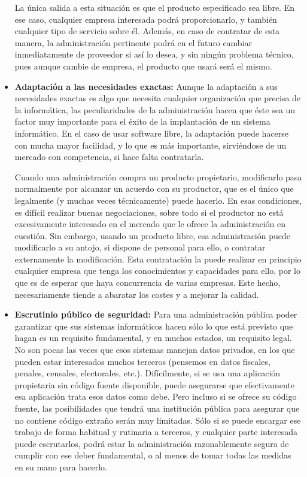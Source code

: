 \begin{itemize}
La única salida a esta situación es que el producto especificado sea libre. En ese caso, cualquier empresa interesada podrá proporcionarlo, y también cualquier tipo de servicio sobre él. Además, en caso de contratar de esta manera, la administración pertinente podrá en el futuro cambiar inmediatamente de proveedor si así lo desea, y sin ningún problema técnico, pues aunque cambie de empresa, el producto que usará será el mismo.

\item \textbf{Adaptación a las necesidades exactas:} Aunque la adaptación a sus necesidades exactas es algo que necesita cualquier organización que precisa de la informática, las peculiaridades de la administración hacen que éste sea un factor muy importante para el éxito de la implantación de un sistema informático. En el caso de usar software libre, la adaptación puede hacerse con mucha mayor facilidad, y lo que es más importante, sirviéndose de un mercado con competencia, si hace falta contratarla.

Cuando una administración compra un producto propietario, modificarlo pasa normalmente por alcanzar un acuerdo con su productor, que es el único que legalmente (y muchas veces técnicamente) puede hacerlo. En esas condiciones, es difícil realizar buenas negociaciones, sobre todo si el productor no está  excesivamente interesado en el mercado que le ofrece la administración en cuestión. Sin embargo, usando un producto libre, esa administración puede modificarlo a su antojo, si dispone de personal para ello, o contratar externamente la modificación. Esta contratación la puede realizar en principio cualquier empresa que tenga los conocimientos y capacidades para ello, por lo que es de esperar que haya concurrencia de varias empresas. Este hecho, necesariamente tiende a abaratar los costes y a mejorar la calidad.

\item \textbf{Escrutinio público de seguridad:} Para una administración pública poder garantizar que sus sistemas informáticos hacen sólo lo que está previsto que hagan es un requisito fundamental, y en muchos estados, un requisito legal. No son pocas las veces que esos sistemas manejan datos privados, en los que pueden estar interesados muchos terceros (pensemos en datos fiscales, penales, censales, electorales, etc.). Difícilmente, si se usa una aplicación propietaria sin código fuente disponible, puede asegurarse que efectivamente esa aplicación trata esos datos como debe. Pero incluso si se ofrece su código fuente, las posibilidades que tendrá una institución pública para asegurar que no contiene código extraño serán muy limitadas. Sólo si se puede encargar ese trabajo de forma habitual y rutinaria a terceros, y cualquier parte interesada puede escrutarlos, podrá estar la administración razonablemente segura de cumplir con ese deber fundamental, o al menos de tomar todas las medidas en su mano para hacerlo.


\end{itemize}
